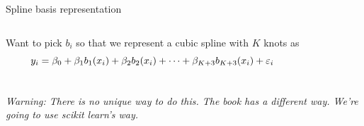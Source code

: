 \documentclass[aspectratio=169,usenames,dvipsnames]{beamer}
\newcommand{\InstructorNotes}[1]{\textit{\color{orange}#1}}
\begin{document}
\begin{frame}[c]{Spline basis representation}

\begin{columns}
\centering
Want to pick $b_i$ so that we represent a cubic spline with $K$ knots as
\begin{equation*}
	y_i = \beta_0 + \beta_1b_1(x_i) + \beta_2 b_2(x_i) + \cdots + \beta_{K+3} b_{K+3}(x_i) + \varepsilon_i
\end{equation*}
\end{columns}

\InstructorNotes{Warning: There is no unique way to do this. The book has a different way. We're going to use scikit learn's way.}

\end{frame}
\end{document}
